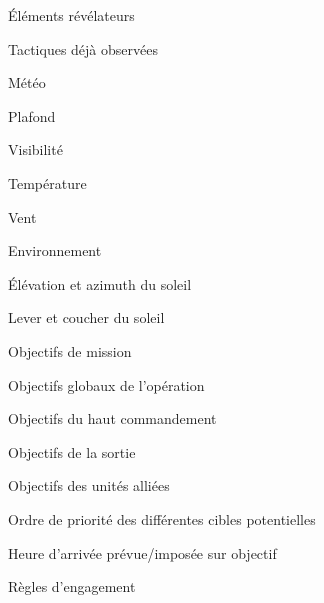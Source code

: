             \item Éléments révélateurs
            \item Tactiques déjà observées
        \ed
    \ed
    \item Météo
    \ee
        \item Plafond
        \item Visibilité
        \item Température
        \item Vent
    \ed
    \item Environnement
    \ee
        \item Élévation et azimuth du soleil
        \item Lever et coucher du soleil
    \ed
    \item Objectifs de mission
    \ee
        \item Objectifs globaux de l’opération
        \item Objectifs du haut commandement
        \item Objectifs de la sortie
        \item Objectifs des unités alliées
        \item Ordre de priorité des différentes cibles potentielles
        \item Heure d’arrivée prévue/imposée sur objectif
        \item Règles d’engagement
    \ed
\ed




